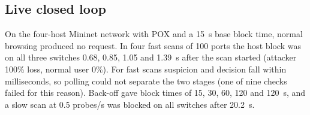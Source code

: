 \subsection{Live closed loop}
On the four-host Mininet network with POX and a 15~s base block time, normal browsing produced no request. In four fast
scans of 100 ports the host block was on all three switches 0.68, 0.85, 1.05 and 1.39~s after the scan started (attacker
100\% loss, normal user 0\%). For fast scans suspicion and decision fall within milliseconds, so polling could not separate
the two stages (one of nine checks failed for this reason). Back-off gave block times of 15, 30, 60, 120 and 120~s, and a slow
scan at 0.5 probes/s was blocked on all switches after 20.2~s.
